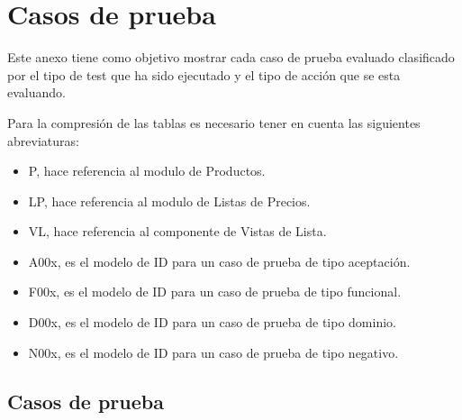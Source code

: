 \chapter{Casos de prueba}
Este anexo tiene como objetivo mostrar cada caso de prueba evaluado clasificado
por el tipo de test que ha sido ejecutado y el tipo de acción que se esta
evaluando.

Para la compresión de las tablas es necesario tener en cuenta las siguientes
abreviaturas:

\begin{itemize}
    \item P, hace referencia al modulo de Productos.
    \item LP, hace referencia al modulo de Listas de Precios.
    \item VL, hace referencia al componente de Vistas de Lista.
    \item A00x, es el modelo de ID para un caso de prueba de tipo aceptación.
    \item F00x, es el modelo de ID para un caso de prueba de tipo funcional.
    \item D00x, es el modelo de ID para un caso de prueba de tipo dominio.
    \item N00x, es el modelo de ID para un caso de prueba de tipo negativo.
\end{itemize}

\section{Casos de prueba}

